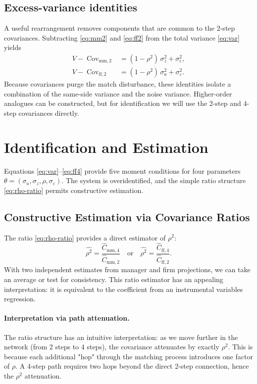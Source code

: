 \documentclass[11pt]{article}
\begin{document}
\subsection{Excess-variance identities}
A useful rearrangement removes components that are common to the 2-step covariances. Subtracting \eqref{eq:mm2} and \eqref{eq:ff2} from the total variance \eqref{eq:var} yields
\begin{align}
\label{eq:excess-mm2}
 V - \operatorname{Cov}_{\text{mm},2} &= (1-\rho^2)\,\sigma_z^2 + \sigma_\varepsilon^2, \\
\label{eq:excess-ff2}
 V - \operatorname{Cov}_{\text{ff},2} &= (1-\rho^2)\,\sigma_a^2 + \sigma_\varepsilon^2.
\end{align}
Because covariances purge the match disturbance, these identities isolate a combination of the same-side variance and the noise variance. Higher-order analogues can be constructed, but for identification we will use the 2-step and 4-step covariances directly.

\section{Identification and Estimation}
\label{sec:ident}
Equations \eqref{eq:var}--\eqref{eq:ff4} provide five moment conditions for four parameters $\theta=(\sigma_a,\sigma_z,\rho,\sigma_\varepsilon)$. The system is overidentified, and the simple ratio structure \eqref{eq:rho-ratio} permits constructive estimation.

\subsection{Constructive Estimation via Covariance Ratios}
\label{sec:constructive}
The ratio \eqref{eq:rho-ratio} provides a direct estimator of $\rho^2$:
\begin{equation}
\label{eq:rho2-est}
 \widehat{\rho^2} = \frac{\widehat C_{\text{mm},4}}{\widehat C_{\text{mm},2}} \quad \text{or} \quad \widehat{\rho^2} = \frac{\widehat C_{\text{ff},4}}{\widehat C_{\text{ff},2}}.
\end{equation}
With two independent estimates from manager and firm projections, we can take an average or test for consistency. This ratio estimator has an appealing interpretation: it is equivalent to the coefficient from an instrumental variables regression.

\paragraph{Interpretation via path attenuation.} The ratio structure has an intuitive interpretation: as we move further in the network (from 2 steps to 4 steps), the covariance attenuates by exactly $\rho^2$. This is because each additional "hop" through the matching process introduces one factor of $\rho$. A 4-step path requires two hops beyond the direct 2-step connection, hence the $\rho^2$ attenuation.
\end{document}
